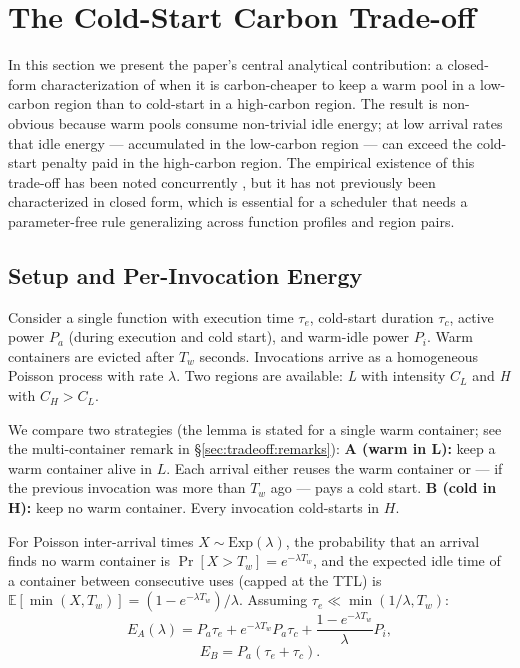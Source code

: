 \section{The Cold-Start Carbon Trade-off}
\label{sec:tradeoff}

In this section we present the paper's central analytical
contribution: a closed-form characterization of when it is
carbon-cheaper to keep a warm pool in a low-carbon region than to
cold-start in a high-carbon region. The result is non-obvious because
warm pools consume non-trivial idle energy; at low arrival rates that
idle energy --- accumulated in the low-carbon region --- can exceed
the cold-start penalty paid in the high-carbon region. The empirical
existence of this trade-off has been noted concurrently
\citep{jiang2024ecolife}, but it has not previously been characterized
in closed form, which is essential for a scheduler that needs a
parameter-free rule generalizing across function profiles and region
pairs.

\subsection{Setup and Per-Invocation Energy}

Consider a single function with execution time $\tau_e$, cold-start
duration $\tau_c$, active power $P_a$ (during execution and cold
start), and warm-idle power $P_i$. Warm containers are evicted after
$T_w$ seconds. Invocations arrive as a homogeneous Poisson process
with rate $\lambda$. Two regions are available: \emph{L} with
intensity $C_L$ and \emph{H} with $C_H > C_L$.

We compare two strategies (the lemma is stated for a single warm
container; see the multi-container remark in
\S\ref{sec:tradeoff:remarks}):
\textbf{A (warm in L):} keep a warm container alive in $L$. Each
arrival either reuses the warm container or --- if the previous
invocation was more than $T_w$ ago --- pays a cold start.
\textbf{B (cold in H):} keep no warm container. Every invocation
cold-starts in $H$.

For Poisson inter-arrival times $X \sim \mathrm{Exp}(\lambda)$, the
probability that an arrival finds no warm container is
$\Pr[X > T_w] = e^{-\lambda T_w}$, and the expected idle time of a
container between consecutive uses (capped at the TTL) is
$\mathbb{E}[\min(X, T_w)] = (1 - e^{-\lambda T_w})/\lambda$. Assuming
$\tau_e \ll \min(1/\lambda, T_w)$:
\begin{equation}
E_A(\lambda) = P_a \tau_e + e^{-\lambda T_w} P_a \tau_c + \frac{1 - e^{-\lambda T_w}}{\lambda} P_i,
\label{eq:EA}
\end{equation}
\begin{equation}
E_B = P_a(\tau_e + \tau_c).
\label{eq:EB}
\end{equation}

